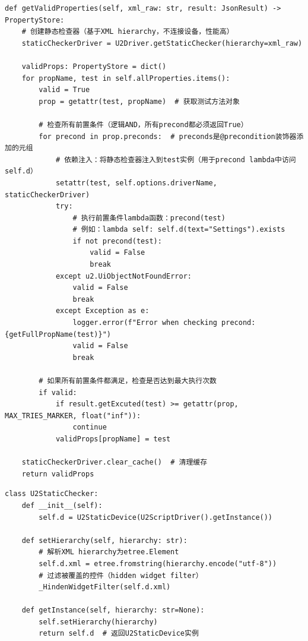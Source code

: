 \documentclass[a4paper, zihao=-4]{ctexart}
\begin{document}
\begin{lstlisting}[label=code:precond_check, caption=前置条件评估实现]
def getValidProperties(self, xml_raw: str, result: JsonResult) -> PropertyStore:
    # 创建静态检查器（基于XML hierarchy，不连接设备，性能高）
    staticCheckerDriver = U2Driver.getStaticChecker(hierarchy=xml_raw)
    
    validProps: PropertyStore = dict()
    for propName, test in self.allProperties.items():
        valid = True
        prop = getattr(test, propName)  # 获取测试方法对象
        
        # 检查所有前置条件（逻辑AND，所有precond都必须返回True）
        for precond in prop.preconds:  # preconds是@precondition装饰器添加的元组
            # 依赖注入：将静态检查器注入到test实例（用于precond lambda中访问self.d）
            setattr(test, self.options.driverName, staticCheckerDriver)
            try:
                # 执行前置条件lambda函数：precond(test)
                # 例如：lambda self: self.d(text="Settings").exists
                if not precond(test):
                    valid = False
                    break
            except u2.UiObjectNotFoundError:
                valid = False
                break
            except Exception as e:
                logger.error(f"Error when checking precond: {getFullPropName(test)}")
                valid = False
                break
        
        # 如果所有前置条件都满足，检查是否达到最大执行次数
        if valid:
            if result.getExcuted(test) >= getattr(prop, MAX_TRIES_MARKER, float("inf")):
                continue
            validProps[propName] = test
    
    staticCheckerDriver.clear_cache()  # 清理缓存
    return validProps
\end{lstlisting}

\begin{lstlisting}[label=code:state_collect, caption=状态解析逻辑]
class U2StaticChecker:
    def __init__(self):
        self.d = U2StaticDevice(U2ScriptDriver().getInstance())
    
    def setHierarchy(self, hierarchy: str):
        # 解析XML hierarchy为etree.Element
        self.d.xml = etree.fromstring(hierarchy.encode("utf-8"))
        # 过滤被覆盖的控件（hidden widget filter）
        _HindenWidgetFilter(self.d.xml)
    
    def getInstance(self, hierarchy: str=None):
        self.setHierarchy(hierarchy)
        return self.d  # 返回U2StaticDevice实例
\end{lstlisting}
\end{document}
